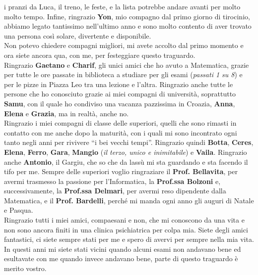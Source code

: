 i pranzi da Luca, il treno, le feste, e la lista potrebbe andare avanti per molto molto tempo. Infine, ringrazio \textbf{Yon}, mio compagno dal primo giorno di tirocinio, abbiamo legato tantissimo nell'ultimo anno e sono molto contento di aver trovato una persona così solare, divertente e disponibile. \\

\noindent Non potevo chiedere compagni migliori, mi avete accolto dal primo momento e ora siete ancora qua, con me, per festeggiare questo traguardo. \\

\noindent Ringrazio \textbf{Gaetano} e \textbf{Charif}, gli unici amici che ho avuto a Matematica, grazie per tutte le ore passate in biblioteca a studiare per gli esami (\textit{passati 1 su 8}) e per le pizze in Piazza Leo tra una lezione e l'altra. Ringrazio anche tutte le persone che ho conosciuto grazie ai miei compagni di università, soprattutto \textbf{Samu}, con il quale ho condiviso una vacanza pazzissima in Croazia, \textbf{Anna}, \textbf{Elena} e \textbf{Grazia}, ma in realtà, anche no. \\

\noindent Ringrazio i miei compagni di classe delle superiori, quelli che sono rimasti in contatto con me anche dopo la maturità, con i quali mi sono incontrato ogni tanto negli anni per rivivere ``i bei vecchi tempi''. Ringrazio quindi \textbf{Botta}, \textbf{Ceres}, \textbf{Elena}, \textbf{Ferro}, \textbf{Gara}, \textbf{Mangio} (\textit{il terzo, unico e inimitabile}) e \textbf{Vaila}. Ringrazio anche \textbf{Antonio}, il Gargiu, che so che da lassù mi sta guardando e sta facendo il tifo per me. Sempre delle superiori voglio ringraziare il \textbf{Prof. Bellavita}, per avermi trasmesso la passione per l'Informatica, la \textbf{Prof.ssa Bolzoni} e, successivamente, la \textbf{Prof.ssa Delmari}, per avermi reso dipendente dalla Matematica, e il \textbf{Prof. Bardelli}, perché mi manda ogni anno gli auguri di Natale e Pasqua. \\
    
\noindent Ringrazio tutti i miei amici, compaesani e non, che mi conoscono da una vita e non sono ancora finiti in una clinica psichiatrica per colpa mia. Siete degli amici fantastici, ci siete sempre stati per me e spero di avervi per sempre nella mia vita. In questi anni mi siete stati vicini quando alcuni esami non andavano bene ed esultavate con me quando invece andavano bene, parte di questo traguardo è merito vostro. \\

